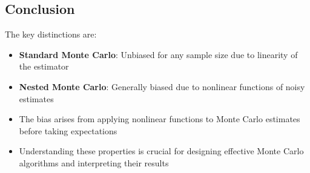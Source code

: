 \begin{notechapter}
\section{Conclusion}

The key distinctions are:

\begin{itemize}
\item \textbf{Standard Monte Carlo}: Unbiased for any sample size due to linearity of the estimator
\item \textbf{Nested Monte Carlo}: Generally biased due to nonlinear functions of noisy estimates
\item The bias arises from applying nonlinear functions to Monte Carlo estimates before taking expectations
\item Understanding these properties is crucial for designing effective Monte Carlo algorithms and interpreting their results
\end{itemize}
\end{notechapter}
